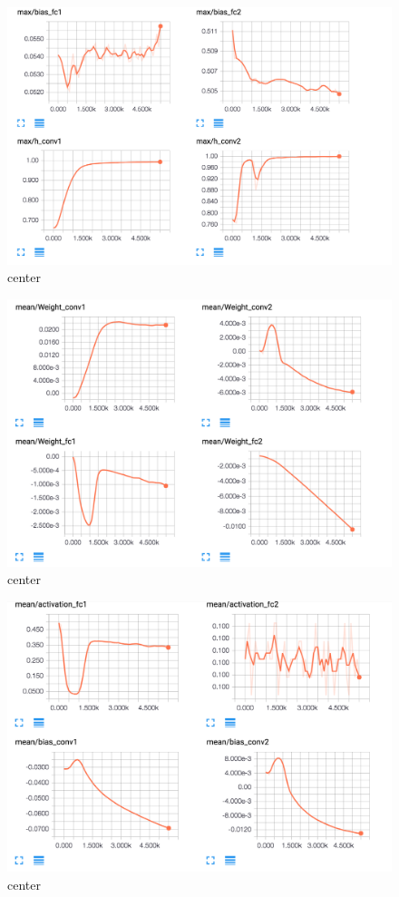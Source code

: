 \documentclass[12pt]{article}
\begin{document}
\begin{figure}[H]
  \caption{center}
  \centering
    \includegraphics[scale=0.3]{b1.png}
\end{figure}
\begin{figure}[H]
  \caption{center}
  \centering
    \includegraphics[scale=0.3]{mean.png}
\end{figure}
\begin{figure}[H]
  \caption{center}
  \centering
    \includegraphics[scale=0.3]{mean3.png}
\end{figure}
\end{document}
